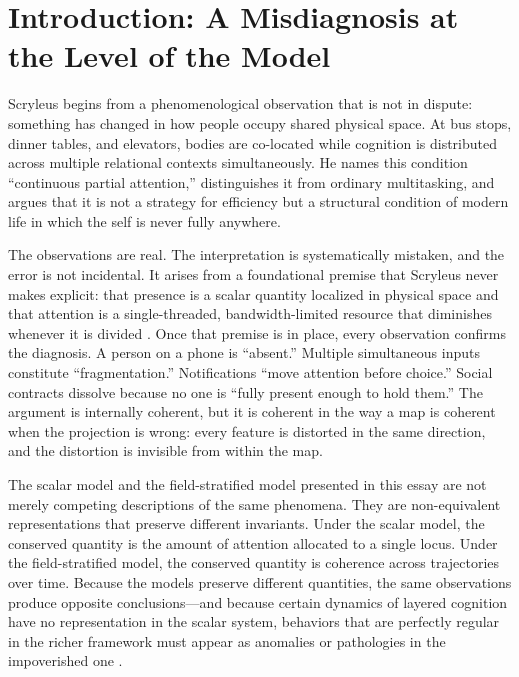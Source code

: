 \documentclass[12pt, a4paper]{article}
\begin{document}
\vspace{1em}

\section{Introduction: A Misdiagnosis at the Level of the Model}

Scryleus begins from a phenomenological observation that is not in dispute: something has changed in how people occupy shared physical space. At bus stops, dinner tables, and elevators, bodies are co-located while cognition is distributed across multiple relational contexts simultaneously. He names this condition ``continuous partial attention,'' distinguishes it from ordinary multitasking, and argues that it is not a strategy for efficiency but a structural condition of modern life in which the self is never fully anywhere.

The observations are real. The interpretation is systematically mistaken, and the error is not incidental. It arises from a foundational premise that Scryleus never makes explicit: that presence is a scalar quantity localized in physical space and that attention is a single-threaded, bandwidth-limited resource that diminishes whenever it is divided \cite{Simon1969}. Once that premise is in place, every observation confirms the diagnosis. A person on a phone is ``absent.'' Multiple simultaneous inputs constitute ``fragmentation.'' Notifications ``move attention before choice.'' Social contracts dissolve because no one is ``fully present enough to hold them.'' The argument is internally coherent, but it is coherent in the way a map is coherent when the projection is wrong: every feature is distorted in the same direction, and the distortion is invisible from within the map.

The scalar model and the field-stratified model presented in this essay are not merely competing descriptions of the same phenomena. They are non-equivalent representations that preserve different invariants. Under the scalar model, the conserved quantity is the amount of attention allocated to a single locus. Under the field-stratified model, the conserved quantity is coherence across trajectories over time. Because the models preserve different quantities, the same observations produce opposite conclusions---and because certain dynamics of layered cognition have no representation in the scalar system, behaviors that are perfectly regular in the richer framework must appear as anomalies or pathologies in the impoverished one \cite{Hutchins1995,Clark2013}.
\end{document}
